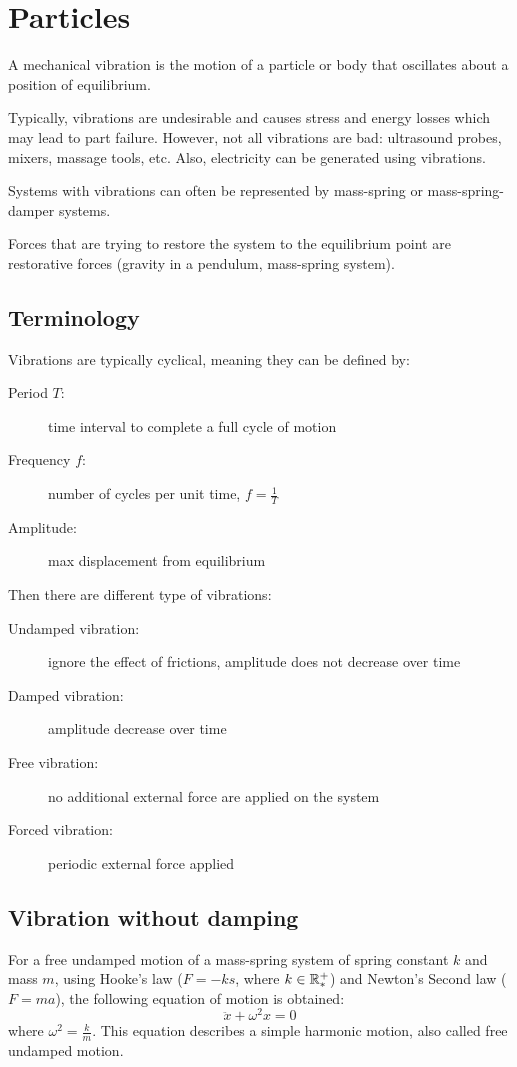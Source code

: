 \documentclass[10pt, twocolumn]{article}
\begin{document}
\section{Particles}
A mechanical vibration is the motion of a particle or body that oscillates about a position of equilibrium.

Typically, vibrations are undesirable and causes stress and energy losses which may lead to part failure.
However, not all vibrations are bad: ultrasound probes, mixers, massage tools, etc.
Also, electricity can be generated using vibrations.

Systems with vibrations can often be represented by mass-spring or mass-spring-damper systems.

Forces that are trying to restore the system to the equilibrium point are restorative forces (gravity in a pendulum, mass-spring system).


\subsection{Terminology}
Vibrations are typically cyclical, meaning they can be defined by:
\begin{description}
  \item[Period \(T\):] time interval to complete a full cycle of motion
  \item[Frequency \(f\):] number of cycles per unit time, \(f = \frac{1}{T}\)
  \item[Amplitude:] max displacement from equilibrium
\end{description}

Then there are different type of vibrations:
\begin{description}
  \item[Undamped vibration:] ignore the effect of frictions, amplitude does not decrease over time
  \item[Damped vibration:] amplitude decrease over time
  \item[Free vibration:] no additional external force are applied on the system
  \item[Forced vibration:] periodic external force applied
\end{description}


\subsection{Vibration without damping}
For a free undamped motion of a mass-spring system of spring constant \(k\) and mass \(m\), using Hooke's law (\(F = -ks\), where \(k \in \mathbb{R}_{*}^{+}\)) and Newton's Second law (\(F = ma\)), the following equation of motion is obtained:
\[
  \ddot{x} + \omega^2 x = 0
\]
where \(\omega^2 = \frac{k}{m}\).
This equation describes a simple harmonic motion, also called free undamped motion.
\end{document}
